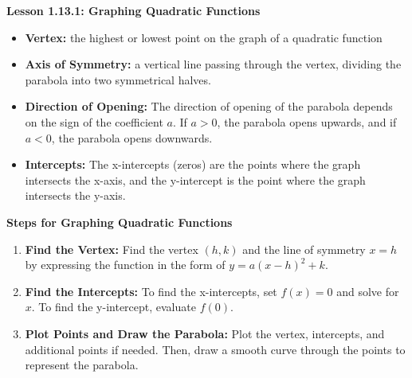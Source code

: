 \begin{center}
\textbf{Lesson 1.13.1: Graphing Quadratic Functions}
\end{center}



\begin{itemize}
    \item \textbf{Vertex:} the highest or lowest point on the graph of a quadratic function
    \item \textbf{Axis of Symmetry:} a vertical line passing through the vertex, dividing the parabola into two symmetrical halves.
    \item \textbf{Direction of Opening:} The direction of opening of the parabola depends on the sign of the coefficient \(a\). If \(a > 0\), the parabola opens upwards, and if \(a < 0\), the parabola opens downwards.
    \item \textbf{Intercepts:} The x-intercepts (zeros) are the points where the graph intersects the x-axis, and the y-intercept is the point where the graph intersects the y-axis.
\end{itemize}

\textbf{Steps for Graphing Quadratic Functions}

\begin{enumerate}
    \item \textbf{Find the Vertex:} Find the vertex $(h, k)$ and the line of symmetry $x=h$ by expressing the function in the form of $y = a(x - h)^{2} + k$.
    \item \textbf{Find the Intercepts:} To find the x-intercepts, set \( f(x) = 0 \) and solve for \( x \). To find the y-intercept, evaluate \( f(0) \).
    \item \textbf{Plot Points and Draw the Parabola:} Plot the vertex, intercepts, and additional points if needed. Then, draw a smooth curve through the points to represent the parabola.
\end{enumerate}


